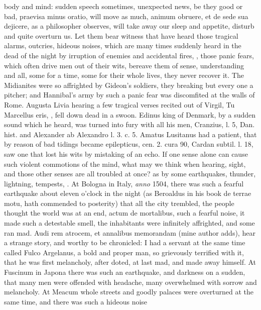 {body and mind: sudden speech sometimes, unexpected news, be they good
or bad, praevisa minus oratio, will move as much, animum obruere, et de
sede sua dejicere, as a philosopher observes, will take away our
sleep and appetite, disturb and quite overturn us. Let them bear
witness that have heard those tragical alarms, outcries, hideous
noises, which are many times suddenly heard in the dead of the night by
irruption of enemies and accidental fires, \etc{}, those panic
fears, which often drive men out of their wits, bereave them of sense,
understanding and all, some for a time, some for their whole lives,
they never recover it. The  Midianites were so affrighted by
Gideon's soldiers, they breaking but every one a pitcher; and
Hannibal's army by such a panic fear was discomfited at the walls
of Rome. Augusta Livia hearing a few tragical verses recited out of
Virgil, Tu Marcellus eris, \etc{}, fell down dead in a swoon. Edinus king
of Denmark, by a sudden sound which he heard,  was turned into
fury with all his men, Cranzius, l. 5, Dan. hist. and Alexander ab
Alexandro l. 3. c. 5. Amatus Lusitanus had a patient, that by reason of
bad tidings became epilepticus, cen. 2. cura 90, Cardan subtil. l. 18,
saw one that lost his wits by mistaking of an echo. If one sense alone
can cause such violent commotions of the mind, what may we think when
hearing, sight, and those other senses are all troubled at once? as by
some earthquakes, thunder, lightning, tempests, \etc{}. At Bologna in
Italy, \emph{anno} 1504, there was such a fearful earthquake about eleven
o'clock in the night (as Beroaldus in his book de terrae motu,
hath commended to posterity) that all the city trembled, the people
thought the world was at an end, actum de mortalibus, such a fearful
noise, it made such a detestable smell, the inhabitants were infinitely
affrighted, and some ran mad. Audi rem atrocem, et annalibus memorandam
(mine author adds), hear a strange story, and worthy to be chronicled:
I had a servant at the same time called Fulco Argelanus, a bold and
proper man, so grievously terrified with it, that he was first
melancholy, after doted, at last mad, and made away himself. At
Fuscinum in Japona there was such an earthquake, and darkness on
a sudden, that many men were offended with headache, many overwhelmed
with sorrow and melancholy. At Meacum whole streets and goodly palaces
were overturned at the same time, and there was such a hideous noise
}
